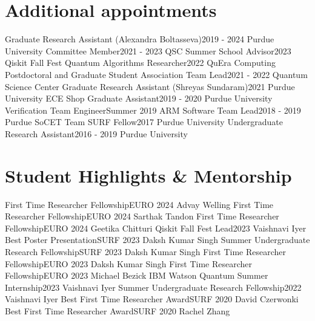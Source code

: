 \section{Additional appointments}
  \resumeSubHeadingListStart
    \resumeSubheading
      {Graduate Research Assistant (Alexandra Boltasseva)}{2019 - 2024}
      {Purdue University}{}
    \resumeSubheading
      {Committee Member}{2021 - 2023}
      {QSC Summer School}{}
    \resumeSubheading
      {Advisor}{2023}
      {Qiskit Fall Fest}{}
    \resumeSubheading
      {Quantum Algorithms Researcher}{2022}
      {QuEra Computing}{}
    \resumeSubheading
      {Postdoctoral and Graduate Student Association Team Lead}{2021 - 2022}
      {Quantum Science Center}{}
    \resumeSubheading
      {Graduate Research Assistant (Shreyas Sundaram)}{2021}
      {Purdue University}{}
    \resumeSubheading
      {ECE Shop Graduate Assistant}{2019 - 2020}
      {Purdue University}{}
    \resumeSubheading
      {Verification Team Engineer}{Summer 2019}
      {ARM}{}
    \resumeSubheading
      {Software Team Lead}{2018 - 2019}
      {Purdue SoCET Team}{}
    \resumeSubheading
      {SURF Fellow}{2017}
      {Purdue University}{}
    \resumeSubheading
      {Undergraduate Research Assistant}{2016 - 2019}
      {Purdue University}{}
  \resumeSubHeadingListEnd
\section{Student Highlights \& Mentorship}
  \resumeSubHeadingListStart
    \resumeSubheading
      {First Time Researcher Fellowship}{EURO 2024}
      {Advay Welling}{}
    \resumeSubheading
      {First Time Researcher Fellowship}{EURO 2024}
      {Sarthak Tandon}{}
    \resumeSubheading
      {First Time Researcher Fellowship}{EURO 2024}
      {Geetika Chitturi}{}
    \resumeSubheading
      {Qiskit Fall Fest Lead}{2023}
      {Vaishnavi Iyer}{}
    \resumeSubheading
      {Best Poster Presentation}{SURF 2023}
      {Daksh Kumar Singh}{}
    \resumeSubheading
      {Summer Undergraduate Research Fellowship}{SURF 2023}
      {Daksh Kumar Singh}{}
    \resumeSubheading
      {First Time Researcher Fellowship}{EURO 2023}
      {Daksh Kumar Singh}{}
    \resumeSubheading
      {First Time Researcher Fellowship}{EURO 2023}
      {Michael Bezick}{}
    \resumeSubheading
      {IBM Watson Quantum Summer Internship}{2023}
      {Vaishnavi Iyer}{}
    \resumeSubheading
      {Summer Undergraduate Research Fellowship}{2022}
      {Vaishnavi Iyer}{}
    \resumeSubheading
      {Best First Time Researcher Award}{SURF 2020}
      {David Czerwonki}{}
    \resumeSubheading
      {Best First Time Researcher Award}{SURF 2020}
      {Rachel Zhang}{}
  \resumeSubHeadingListEnd
